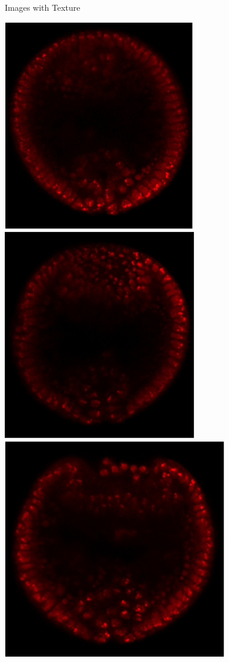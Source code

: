 \documentclass[10pt]{beamer}
\begin{document}
\begin{frame}{Images with Texture}
\begin{center}
\vspace{0.1in}
\includegraphics[width=\imwidth]{nuclei7}
\hspace{0.2in}
\includegraphics[width=\imwidth]{nuclei8}
\hspace{0.2in}
\includegraphics[width=\imwidth]{nuclei9}

\end{center}
\end{frame}
\end{document}
